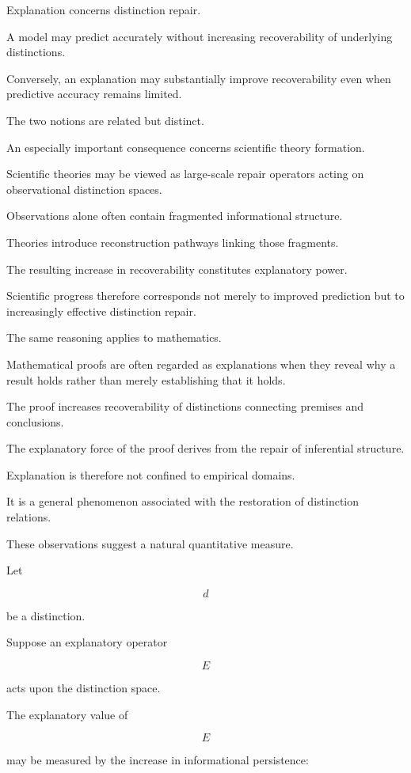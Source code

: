 \documentclass[12pt,oneside]{article}
\theoremstyle{definition}
\begin{document}
Explanation concerns distinction repair.

A model may predict accurately without increasing recoverability of underlying distinctions.

Conversely, an explanation may substantially improve recoverability even when predictive accuracy remains limited.

The two notions are related but distinct.

An especially important consequence concerns scientific theory formation.

Scientific theories may be viewed as large-scale repair operators acting on observational distinction spaces.

Observations alone often contain fragmented informational structure.

Theories introduce reconstruction pathways linking those fragments.

The resulting increase in recoverability constitutes explanatory power.

Scientific progress therefore corresponds not merely to improved prediction but to increasingly effective distinction repair.

The same reasoning applies to mathematics.

Mathematical proofs are often regarded as explanations when they reveal why a result holds rather than merely establishing that it holds.

The proof increases recoverability of distinctions connecting premises and conclusions.

The explanatory force of the proof derives from the repair of inferential structure.

Explanation is therefore not confined to empirical domains.

It is a general phenomenon associated with the restoration of distinction relations.

These observations suggest a natural quantitative measure.

Let

\[
d
\]

be a distinction.

Suppose an explanatory operator

\[
E
\]

acts upon the distinction space.

The explanatory value of

\[
E
\]

may be measured by the increase in informational persistence:
\end{document}
